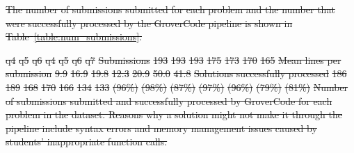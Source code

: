 \documentclass[12pt,twoside]{mitthesis}
\providecommand{\DIFdeltex}[1]{{\protect\color{red}\sout{#1}}}                      %
\providecommand{\DIFdelFL}[1]{\DIFdel{#1}} %
\providecommand{\DIFdel}[1]{\texorpdfstring{\DIFdeltex{#1}}{}} %
\begin{document}


\DIFdel{The number of submissions submitted for each problem and the number that were successfully processed by the GroverCode pipeline is shown in Table~\ref{table:num_submissions}.
}%

\DIFdelFL{q4 }%
\DIFdelFL{q5 }%
\DIFdelFL{q6 }%
\DIFdelFL{q4 }%
\DIFdelFL{q5 }%
\DIFdelFL{q6 }%
\DIFdelFL{q7 }%
\DIFdelFL{Submissions }%
\DIFdelFL{193 }%
\DIFdelFL{193 }%
\DIFdelFL{193 }%
\DIFdelFL{175 }%
\DIFdelFL{173 }%
\DIFdelFL{170 }%
\DIFdelFL{165 }%
\DIFdelFL{Mean lines per submission }%
\DIFdelFL{9.9 }%
\DIFdelFL{16.9 }%
\DIFdelFL{19.8 }%
\DIFdelFL{12.3 }%
\DIFdelFL{20.9 }%
\DIFdelFL{50.0 }%
\DIFdelFL{41.8 }%
\DIFdelFL{Solutions successfully processed }%
\DIFdelFL{186 }%
\DIFdelFL{189 }%
\DIFdelFL{168  }%
\DIFdelFL{170 }%
\DIFdelFL{166  }%
\DIFdelFL{134 }%
\DIFdelFL{133 }%
\DIFdelFL{(96\%) }%
\DIFdelFL{(98\%) }%
\DIFdelFL{(87\%) }%
\DIFdelFL{(97\%) }%
\DIFdelFL{(96\%) }%
\DIFdelFL{(79\%) }%
\DIFdelFL{(81\%) }%
{%
\DIFdelFL{Number of submissions submitted and successfully processed  by GroverCode for each problem in the dataset. Reasons why a solution might not make it through the pipeline include syntax errors and memory management issues caused by students' inappropriate function calls.}}
\end{document}
